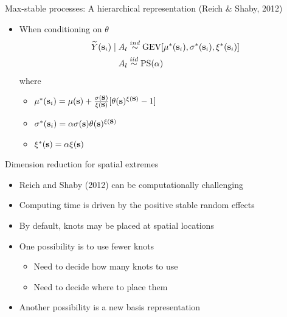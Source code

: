 \documentclass{beamer}
\begin{document}
\begin{frame}{Max-stable processes: A hierarchical representation (Reich \& Shaby, 2012)}
\begin{itemize} \setlength{\itemsep}{1em}
  \item When conditioning on $\theta$
  \begin{align*}
    \widetilde{Y}(\mbox{\bf s}_i) \mid A_l &\stackrel{ind}{\sim} \text{GEV}[\mu^*(\mbox{\bf s}_i), \sigma^*(\mbox{\bf s}_i), \xi^*(\mbox{\bf s}_i)] \\
    A_l &\stackrel{iid}{\sim} \text{PS}(\alpha)
  \end{align*}
  where
  \begin{itemize} \setlength{\itemsep}{0.5em}
    \item $\mu^*(\mbox{\bf s}_i) = \mu(\mbox{\bf s}) + \frac{\sigma(\mbox{\bf s})}{\xi(\mbox{\bf s})}[\theta(\mbox{\bf s})^{\xi(\mbox{\bf s})} - 1]$
    \item $\sigma^*(\mbox{\bf s}_i) = \alpha \sigma(\mbox{\bf s}) \theta(\mbox{\bf s})^{\xi(\mbox{\bf s})}$
    \item $\xi^*(\mbox{\bf s}) = \alpha \xi(\mbox{\bf s})$
  \end{itemize}
\end{itemize}
\end{frame}

\begin{frame}{Dimension reduction for spatial extremes}
  \begin{itemize} \setlength{\itemsep}{1em}
    \item Reich and Shaby (2012) can be computationally challenging
    \item Computing time is driven by the positive stable random effects
    \item By default, knots may be placed at spatial locations
    \item One possibility is to use fewer knots
    \begin{itemize} \setlength{\itemsep}{0.5em}
      \item Need to decide how many knots to use
      \item Need to decide where to place them
    \end{itemize}
    \item Another possibility is a new basis representation
  \end{itemize}
\end{frame}
\end{document}
